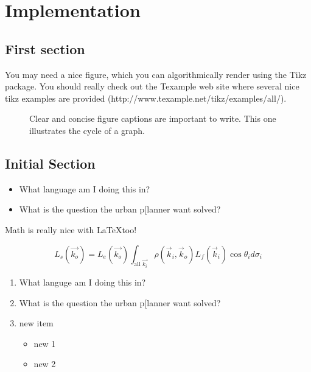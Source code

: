 \chapter{Implementation}
\label{chap:impl}

\section{First section}

You may need a nice figure, which you can algorithmically render using the Tikz package. You should really check out the Texample web site where several nice tikz examples are provided (http://www.texample.net/tikz/examples/all/).

\begin{figure}
\centering
{}
\caption{Clear and concise figure captions are important to write. This one illustrates the cycle of a graph.}
\label{fig:tikzexample}
\end{figure}

\section{Initial Section}

\begin{itemize}
\item What language am I doing this in?
\item What is the question the urban p[lanner want solved?
\end{itemize}
 
Math is really nice with \LaTeX too!

\[L_{s}(\vec{k_{o}}) = L_{e}(\vec{k_{o}}) \int_{\text{all $\vec{k_{i}}$}} \rho(\vec{k}_i,\vec{k}_o) L_f(\vec{k}_i) \cos\theta_i d\sigma_i \]

\begin{enumerate}
\item What languge am I doing this in?
\item What is the question the urban p[lanner want solved?
\item new item
\begin{itemize}
\item new 1
\item new 2
\end{itemize}
\end{enumerate}

